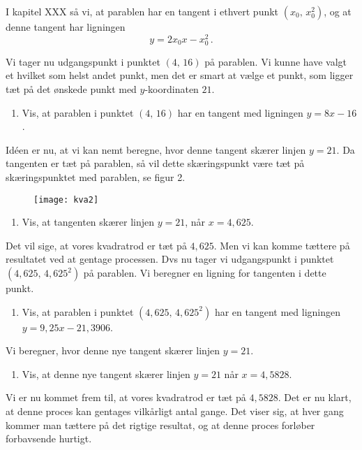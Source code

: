 \documentclass[12pt,oneside,a4paper]{article}
\theoremstyle{plain}
\begin{document}
I kapitel XXX så vi, at parablen har en tangent i ethvert punkt $(x_0,\,
x_0^2)$, og at denne tangent har ligningen
\[
    y=2x_0x - x_0^2 \,.
\]

Vi tager nu udgangspunkt i punktet $(4,\,16)$ på parablen. Vi kunne have valgt
et hvilket som helst andet punkt, men det er smart at vælge et punkt, som
ligger tæt på det ønskede punkt med $y$-koordinaten $21$.

\begin{enumerate}[label=(\alph*)]
    \item Vis, at parablen i punktet $(4,\,16)$ har en tangent med ligningen
        $y=8x-16$.
\end{enumerate}

Idéen er nu, at vi kan nemt beregne, hvor denne tangent skærer linjen $y=21$. 
Da tangenten er tæt på parablen, så vil dette skæringspunkt være tæt på 
skæringspunktet med parablen, se figur 2.

\begin{figure}[ht]
    \centering
    \texttt{[image: kva2]}
    \caption{}
    \label{fig2}
\end{figure}

\begin{enumerate}[label=(\alph*), resume]
    \item Vis, at tangenten skærer linjen $y=21$, når $x=4,625$.
\end{enumerate}

Det vil sige, at vores kvadratrod er tæt på $4,625$. Men vi kan komme tættere
på resultatet ved at gentage processen. Dvs nu tager vi udgangspunkt i punktet
$(4,625,\,4,625^2)$ på parablen. Vi beregner en ligning for tangenten i dette
punkt.

\begin{enumerate}[label=(\alph*), resume]
    \item Vis, at parablen i punktet $(4,625,\,4,625^2)$ har en tangent med
        ligningen $y=9,25x-21,3906$.
\end{enumerate}
Vi beregner, hvor denne nye tangent skærer linjen $y=21$.

\begin{enumerate}[label=(\alph*), resume]
    \item Vis, at denne nye tangent skærer linjen $y=21$ når $x=4,5828$.
\end{enumerate}

Vi er nu kommet frem til, at vores kvadratrod er tæt på $4,5828$.
Det er nu klart, at denne proces kan gentages vilkårligt antal gange.
Det viser sig, at hver gang kommer man tættere på det rigtige resultat, og
at denne proces forløber forbavsende hurtigt.
\end{document}
